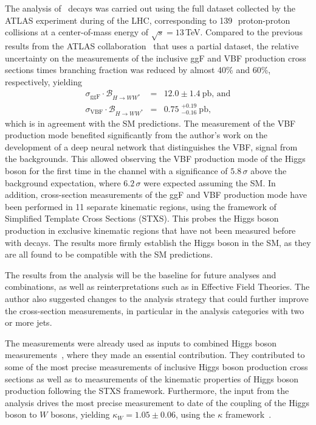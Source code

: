 The analysis of \HWW\ decays was carried out using the full dataset collected by the ATLAS experiment during \RunTwo of the LHC, corresponding to 139\,\ifb\ proton-proton collisions at a center-of-mass energy of $\sqrt{s} = 13\,$TeV. 
Compared to the previous results from the ATLAS collaboration~\cite{HIGG-2016-07} that uses a partial \RunTwo dataset, the relative uncertainty on the measurements of the inclusive ggF and VBF production cross sections times branching fraction was reduced by almost 40\% and 60\%, respectively, yielding 
\begin{eqnarray*}
    \sigma_{\mathrm{ggF}} \cdot \mathcal{B}_{H \to WW^{\ast}} &=& 12.0 \pm 1.4~\mathrm{pb}, \,\text{and} \\
    \sigma_{\mathrm{VBF}} \cdot \mathcal{B}_{H \to WW^{\ast}} &=& 0.75\;^{+0.19}_{-0.16}~\mathrm{pb},
\end{eqnarray*}
which is in agreement with the SM predictions.
The measurement of the VBF production mode benefited significantly from the author's work on the development of a deep neural network that distinguishes the VBF, \HWW signal from the backgrounds.
This allowed observing the VBF production mode of the Higgs boson for the first time in the \HWW channel with a significance of $5.8\,\sigma$ above the background expectation, where $6.2\,\sigma$ were expected assuming the SM.
In addition, cross-section measurements of the ggF and VBF production mode have been performed in 11 separate kinematic regions, using the framework of Simplified Template Cross Sections (STXS). This probes the Higgs boson production in exclusive kinematic regions that have not been measured before with \HWW decays.
The results more firmly establish the Higgs boson in the SM, as they are all found to be compatible with the SM predictions.

The results from the \HWW analysis will be the baseline for future analyses and combinations, as well as reinterpretations such as in Effective Field Theories.
The author also suggested changes to the analysis strategy that could further improve the \HWW cross-section measurements, in particular in the analysis categories with two or more jets.

The measurements were already used as inputs to combined Higgs boson measurements~\cite{NaturePaper}, where they made an essential contribution. 
They contributed to some of the most precise measurements of inclusive Higgs boson production cross sections as well as to measurements of the kinematic properties of Higgs boson production following the STXS framework.
Furthermore, the input from the \HWW analysis drives the most precise measurement to date of the coupling of the Higgs boson to $W$ bosons, yielding $\kappa_{W} = 1.05 \pm 0.06$, using the $\kappa$ framework~\cite{LHCHandbookV3}.

